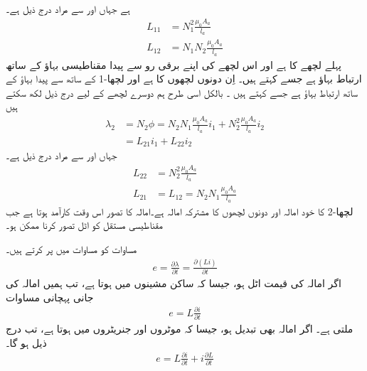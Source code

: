 ہے جہاں  اور  سے مراد درج ذیل ہے۔
\begin{align}
L_{11}&=N_1^2  \frac{\mu_0 A_a}{l_a}\\
L_{12}&=N_1 N_2  \frac{\mu_0 A_a}{l_a}
\end{align}
 پہلے لچھے کا    ہے اور   اس لچھے کی  اپنے برقی رو  سے پیدا مقناطیسی بہاؤ  کے ساتھ  ارتباط بہاؤ ہے جسے  کہتے ہیں۔  اِن دونوں لچھوں  کا   ہے اور    لچھا-1  کے ساتھ   سے پیدا بہاؤ کے ساتھ  ارتباط بہاؤ  ہے جسے   کہتے ہیں ۔ بالکل اسی طرح ہم دوسرے لچھے کے لیے درج ذیل لکھ سکتے ہیں
\begin{align}
\lambda_2&=N_2 \phi=N_2 N_1 \frac{\mu_0 A_a}{l_a} i_1+N_2^2 \frac{\mu_0 A_a}{l_a} i_2  \nonumber \\
&=L_{21} i_1+L_{22} i_2 \label{مساوات_مقناطیسی_دور_دوسرے_لچھے_کی_ارتباط}
\end{align}
جہاں  اور  سے مراد درج ذیل ہے۔
\begin{align}
L_{22}&=N_2^2 \frac{\mu_0 A_a}{l_a}\\
L_{21}&=L_{12}=N_2 N_1 \frac{\mu_0 A_a}{l_a} \label{مساوات_مقناطیسی_دور_مشترکہ_امالہ_یکساں}
\end{align}
 لچھا-2  کا خود امالہ اور   دونوں لچھوں کا مشترکہ امالہ ہے۔امالہ کا تصور اس وقت کارآمد ہوتا ہے جب مقناطیسی مستقل   کو اٹل تصور کرنا ممکن ہو۔

مساوات   کو مساوات   میں پر کرتے ہیں۔
\begin{align}
e=\frac{\partial \lambda}{\partial t}=\frac{\partial \left( L i\right) }{\partial t}
\end{align}
اگر امالہ کی قیمت اٹل ہو، جیسا کہ ساکن مشینوں  میں ہوتا ہے، تب ہمیں  امالہ کی جانی پہچانی مساوات
\begin{align}
e=L \frac{\partial i}{\partial t}
\end{align}
ملتی ہے۔ اگر امالہ بھی تبدیل ہو، جیسا کہ موٹروں اور جنریٹروں میں ہوتا ہے، تب درج ذیل ہو گا۔
\begin{align}
e= L \frac{\partial i}{\partial t} + i \frac{\partial L}{\partial t}
\end{align}

